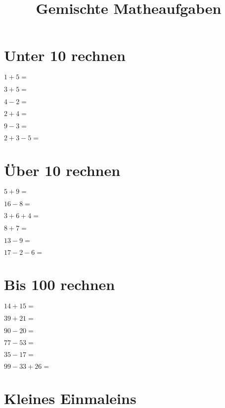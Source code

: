 \documentclass{article}
\title{Gemischte Matheaufgaben }
\newcommand{\addition}[2]{
$ {#1} + {#2} = $

}
\newcommand{\subtraktion}[2]{
$ {#1} - {#2} = $

}
\begin{document}
\section{Unter 10 rechnen}

\doublespacing
\begin{multicols}{3}


\addition{1}{5}

\addition{3}{5}

\subtraktion{4}{2}

\addition{2}{4}

\subtraktion{9}{3}

$2 + 3 - 5 = $

\end{multicols}

\singlespacing
\section{Über 10 rechnen}

\doublespacing
\begin{multicols}{3}
$ 5 + 9 = $

$ 16 - 8 = $

$ 3 + 6 + 4 = $

$ 8 + 7 = $

$ 13 - 9 = $

$ 17 - 2 - 6 = $

\end{multicols}

\singlespacing

\section{Bis 100 rechnen}

\doublespacing

\begin{multicols}{3}
$14 + 15 = $

$39 + 21 = $

$90 - 20 = $ 

$77 - 53 = $

$35 - 17 = $

$99 - 33 + 26 = $
\end{multicols}

\singlespacing

\section{Kleines Einmaleins}
\end{document}
